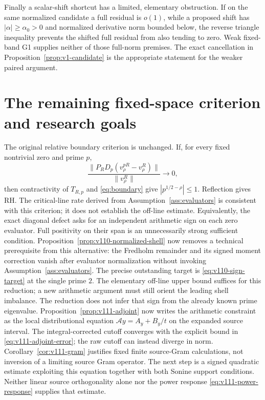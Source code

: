 \documentclass[11pt]{article}
\theoremstyle{remark}
\begin{document}
Finally a scalar-shift shortcut has a limited, elementary obstruction.
If on the same normalized candidate a full residual is $o(1)$, while a
proposed shift has $|\alpha|\ge\alpha_0>0$ and normalized derivative
norm bounded below, the reverse triangle inequality prevents the shifted
full residual from also tending to zero. Weak fixed-band G1 supplies
neither of those full-norm premises. The exact cancellation in
Proposition~\ref{prop:v1-candidate} is the appropriate statement for the
weaker paired argument.

\section{The remaining fixed-space criterion and research goals}\label{sec:goals}
The original relative boundary criterion is unchanged. If, for every
fixed nontrivial zero and prime $p$,
\[
 \frac{\|P_RD_p(v_\rho^{pR}-v_\rho^R)\|}{\|v_\rho^R\|}
 \longrightarrow0,
\]
then contractivity of $T_{R,p}$ and \eqref{eq:boundary} give
$|p^{1/2-\rho}|\le1$. Reflection gives RH. The critical-line rate
derived from Assumption~\ref{ass:evaluators} is consistent with this
criterion; it does not establish the off-line estimate. Equivalently,
the exact diagonal defect asks for an independent arithmetic sign on
each zero evaluator. Full positivity on their span is an unnecessarily
strong sufficient condition.
Proposition~\ref{prop:v110-normalized-shell} now removes a technical
prerequisite from this alternative: the Fredholm remainder and its signed
moment correction vanish after evaluator normalization without invoking
Assumption~\ref{ass:evaluators}. The precise outstanding target is
\eqref{eq:v110-sign-target} at the single prime $2$. The elementary
off-line upper bound suffices for this reduction; a new arithmetic
argument must still orient the leading shell imbalance. The reduction
does not infer that sign from the already known prime eigenvalue.
Proposition~\ref{prop:v111-adjoint} now writes the arithmetic constraint
as the local distributional equation $\mathscr Ay=A_y+B_y/t$ on the
expanded source interval. The integral-corrected cutoff converges with
the explicit bound in \eqref{eq:v111-adjoint-error}; the raw cutoff can
instead diverge in norm. Corollary~\ref{cor:v111-gram} justifies fixed
finite source-Gram calculations, not inversion of a limiting source
Gram operator. The next step is a signed quadratic estimate exploiting
this equation together with both Sonine support conditions. Neither
linear source orthogonality alone nor the power response
\eqref{eq:v111-power-response} supplies that estimate.
\end{document}
